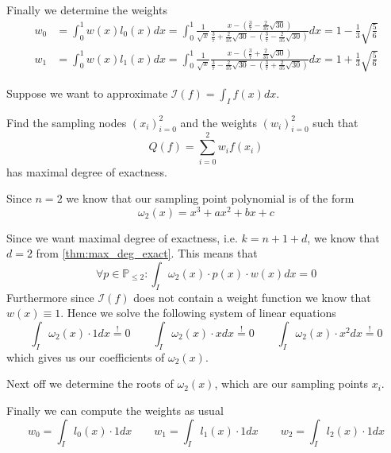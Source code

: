 \begin{example}
   Finally we determine the weights
   \begin{equation*}
      \begin{split}
         w_0 & = \int_0^1 w(x)l_0(x) dx = \int_0^1 \frac{1}{\sqrt{x}} \frac{x - \left(\frac{3}{7} - \frac{2}{35} \sqrt{30}\right)}{\frac{3}{7} + \frac{2}{35} \sqrt{30} - \left(\frac{3}{7} - \frac{2}{35} \sqrt{30}\right)} dx = 1 - \frac{1}{3}\sqrt{\frac{5}{6}}\\
         w_1 & = \int_0^1 w(x)l_1(x) dx = \int_0^1 \frac{1}{\sqrt{x}} \frac{x - \left(\frac{3}{7} + \frac{2}{35} \sqrt{30}\right)}{\frac{3}{7} - \frac{2}{35} \sqrt{30} - \left(\frac{3}{7} + \frac{2}{35} \sqrt{30}\right)} dx = 1 + \frac{1}{3}\sqrt{\frac{5}{6}}
      \end{split}
   \end{equation*}
\end{example}

\begin{example}
   Suppose we want to approximate \(\mathcal{I}(f) = \int_I f(x) dx\).

   Find the sampling nodes \((x_i)_{i=0}^2\) and the weights \((w_i)_{i=0}^2\) such that
   \[Q(f) = \sum_{i=0}^2 w_i f(x_i)\]
   has maximal degree of exactness.

   Since \(n=2\) we know that our sampling point polynomial is of the form
   \[\omega_2(x) = x^3 + ax^2 + bx + c\]

   Since we want maximal degree of exactness, i.e. \(k = n + 1 + d\), we know that \(d = 2\) from \cref{thm:max_deg_exact}.
   This means that
   \[\forall p \in \mathbb{P}_{\leq 2}: \int_I \omega_2(x) \cdot p(x) \cdot w(x) dx = 0\]
   Furthermore since \(\mathcal{I}(f)\) does not contain a weight function we know that \(w(x) \equiv 1\).
   Hence we solve the following system of linear equations
   \[\int_I \omega_2(x) \cdot 1 dx \overset{!}{=} 0 \qquad \int_I \omega_2(x) \cdot x dx \overset{!}{=} 0 \qquad \int_I \omega_2(x) \cdot x^2 dx \overset{!}{=} 0\]
   which gives us our coefficients of \(\omega_2(x)\).

   Next off we determine the roots of \(\omega_2(x)\), which are our sampling points \(x_i\).

   Finally we can compute the weights as usual
   \[w_0 = \int_I l_0(x) \cdot 1 dx \qquad w_1 = \int_I l_1(x) \cdot 1 dx \qquad w_2 = \int_I l_2(x) \cdot 1 dx\]
\end{example}

